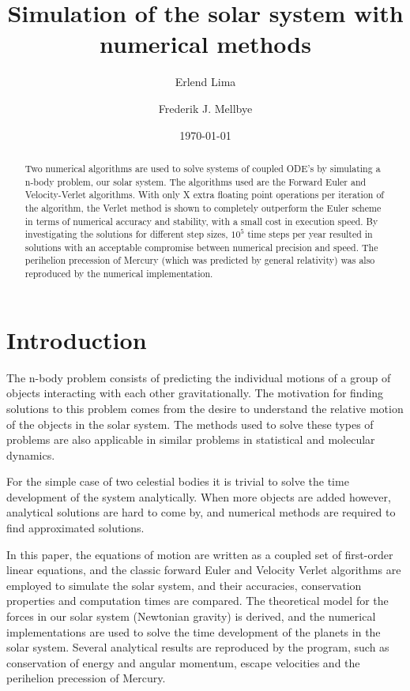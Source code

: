 \documentclass[aps,reprint]{revtex4-1}
\begin{document}
\title{Simulation of the solar system with numerical methods}
\author{Erlend Lima}
\author{Frederik J. Mellbye}
\date{\today}

\begin{abstract}
Two numerical algorithms are used to solve systems of coupled ODE's by simulating a n-body problem, our solar system.
The algorithms used are the Forward Euler and Velocity-Verlet algorithms. With only X extra floating point operations per
iteration of the algorithm, the Verlet method is shown to completely outperform the Euler scheme in terms of numerical accuracy and stability,
with a small cost in execution speed. By investigating the solutions for different step sizes, $10^5$ time steps per year resulted in
solutions with an acceptable compromise between numerical precision and speed. The perihelion precession of Mercury (which
was predicted by general relativity) was also reproduced by the numerical implementation.
\end{abstract}
\maketitle
\tableofcontents
\makeatletter
\let\toc@pre\relax
\let\toc@post\relax
\makeatother

\newpage

\section{Introduction}
\label{sec:introduction}
The n-body problem consists of predicting the individual motions of a group of objects
interacting with each other gravitationally. The motivation for finding solutions
to this problem comes from the desire to understand the relative motion of the
objects in the solar system. The methods used to solve these types of problems are also applicable in
similar problems in statistical and molecular dynamics.

For the simple case of two celestial bodies it is trivial to solve the time
development of the system analytically. When more objects are added however,
analytical solutions are hard to come by, and numerical methods are required to find
approximated solutions.

In this paper, the equations of motion are written as a coupled set of first-order linear equations, and
the classic forward Euler and Velocity Verlet algorithms are employed to simulate the solar system,
and their accuracies, conservation properties and computation times are compared. The theoretical
model for the forces in our solar system (Newtonian gravity) is derived, and the numerical implementations
are used to solve the time development of the planets in the solar system. Several analytical results are reproduced by the program, such as conservation of energy and angular momentum, escape velocities and the perihelion precession of Mercury.
\end{document}
